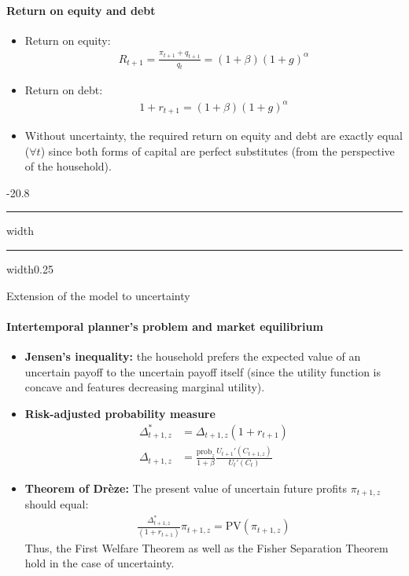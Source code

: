 \documentclass[a4paper,landscape,7pt,fleqn]{scrartcl}
\makeatletter
\renewcommand{\emph}[1]{\textbf{#1}}
\renewcommand{\subsection}{\@startsection{subsection}{1}{0mm}%
{-2\baselineskip}{0.8\baselineskip}%
{\hrule depth 0.2pt width\columnwidth\hrule depth0.75pt
width0.25\columnwidth\vspace*{1.2em}\large\bfseries}}
\makeatother
\begin{document}
\begin{multicols*}{3}
\paragraph{Return on equity and debt}

\begin{itemize}
\item Return on equity:
\begin{align*}
R_{t+1} = \frac{\pi_{t+1} + q_{t+1}}{q_t} = (1+\beta) (1+g)^\alpha
\end{align*}
\item Return on debt:
\begin{align*}
1+r_{t+1} = (1+\beta) (1+g)^\alpha
\end{align*}
\item Without uncertainty, the required return on equity and debt are exactly equal ($\forall t$) since both forms of capital are perfect substitutes (from the perspective of the household).
\end{itemize}

\subsection{Extension of the model to uncertainty}

\paragraph{Intertemporal planner's problem and market equilibrium}

\begin{itemize}
\item \emph{Jensen's inequality:} the household prefers the expected value of an uncertain payoff to the uncertain payoff itself (since the utility function is concave and features decreasing marginal utility).
\item \emph{Risk-adjusted probability measure}
\begin{align*}
\Delta_{t+1,z}^\ast &= \Delta_{t+1,z} (1+r_{t+1}) \\
\Delta_{t+1,z} &= \frac{\text{prob}_z}{1+\beta} \frac{U_{t+1}'(C_{t+1,z})}{U_t'(C_t)}
\end{align*}
\item \emph{Theorem of Drèze:} The present value of uncertain future profits $\pi_{t+1,z}$ should equal:
\begin{align*}
\frac{\Delta_{t+1,z}^\ast}{(1+r_{t+1})} \pi_{t+1,z} = \text{PV}(\pi_{t+1,z})
\end{align*}
Thus, the First Welfare Theorem as well as the Fisher Separation Theorem hold in the case of uncertainty.
\end{itemize}


\end{multicols*}
\end{document}

